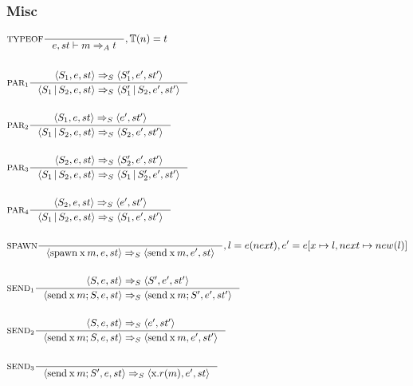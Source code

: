 \subsubsection{Misc}
\newcommand{\Tspawn}{\mathbin{\text{spawn}}}
\newcommand{\Tsend}{\mathbin{\text{send}}}
\begin{align*}
&\inference[TYPEOF]{}
                  {e,st \vdash m \Rightarrow_A t}
									{, \mathbb{T}(n) = t}
\\\\
&\inference[$\text{PAR}_1$]{\Braket{S_1,e,st} \Rightarrow_S \Braket{S_1',e',st'}}
                       {\Braket{S_1|S_2,e,st} \Rightarrow_S \Braket{S_1'|S_2,e',st'}}
\\\\
&\inference[$\text{PAR}_2$]{\Braket{S_1,e,st} \Rightarrow_S \Braket{e',st'}}
                       {\Braket{S_1|S_2,e,st} \Rightarrow_S \Braket{S_2,e',st'}}
\\\\
&\inference[$\text{PAR}_3$]{\Braket{S_2,e,st} \Rightarrow_S \Braket{S_2',e',st'}}
                       {\Braket{S_1|S_2,e,st} \Rightarrow_S \Braket{S_1|S_2',e',st'}}
\\\\
&\inference[$\text{PAR}_4$]{\Braket{S_2,e,st} \Rightarrow_S \Braket{e',st'}}
                       {\Braket{S_1|S_2,e,st} \Rightarrow_S \Braket{S_1,e',st'}}
\\\\
&\inference[$\text{SPAWN}$]{}
                       {\Braket{\Tspawn \Tx m,e,st} \Rightarrow_S \Braket{\Tsend \Tx m,e',st}}
												{, l = e(next), e' = e[x\mapsto l, next\mapsto new(l)]}
\\\\
&\inference[$\text{SEND}_1$]{\Braket{S,e,st} \Rightarrow_S \Braket{S',e',st'}}
                       {\Braket{\Tsend \Tx m ; S,e,st} \Rightarrow_S \Braket{\Tsend \Tx m;S',e',st'}}
\\\\
&\inference[$\text{SEND}_2$]{\Braket{S,e,st} \Rightarrow_S \Braket{e',st'}}
                       {\Braket{\Tsend \Tx m;S,e,st} \Rightarrow_S \Braket{\Tsend \Tx m,e',st'}}
\\\\
&\inference[$\text{SEND}_3$]{}
                       {\Braket{\Tsend \Tx m ; S',e,st} \Rightarrow_S \Braket{\Tx.r(m),e',st}}
\end{align*}